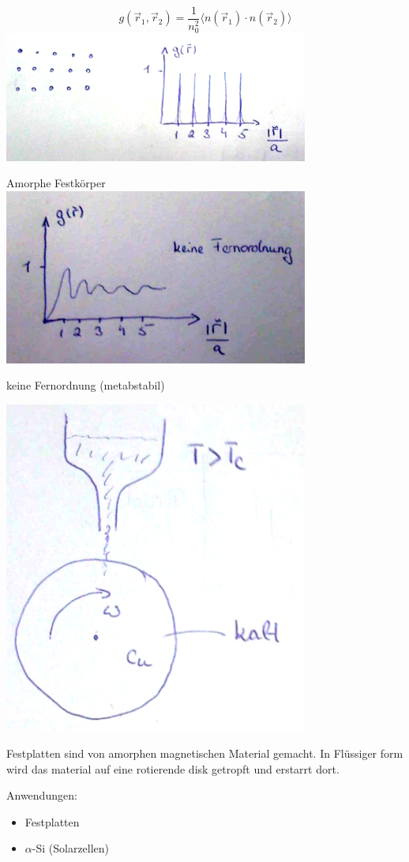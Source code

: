\[ g(\vec r_1, \vec r_2) = \frac 1 {n^2_0} \langle n(\vec r_1)\cdot
n(\vec r_2) \rangle \]
\includegraphics[width=0.75\textwidth]{kap04_08.png}

Amorphe Festkörper
\includegraphics[width=0.75\textwidth]{kap04_09.png} 

keine Fernordnung (metabstabil)

\includegraphics[width=0.75\textwidth]{kap04_10.png}

Festplatten sind von amorphen magnetischen Material gemacht. In
Flüssiger form wird das material auf eine rotierende disk getropft und
erstarrt dort.

Anwendungen:
\begin{itemize}
\item Festplatten
\item \(\alpha\)-Si (Solarzellen)
\end{itemize}

